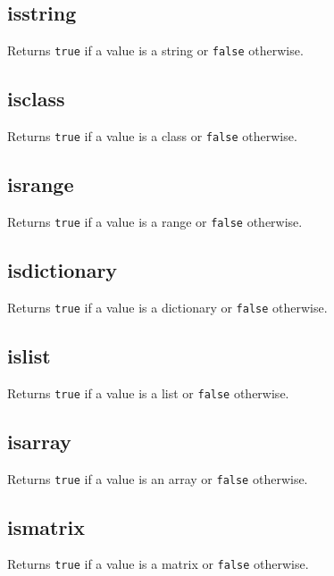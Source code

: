 \hypertarget{isstring}{%
\subsection{isstring}\label{isstring}}

Returns \texttt{true} if a value is a string or \texttt{false}
otherwise.

\hypertarget{isclass}{%
\subsection{isclass}\label{isclass}}

Returns \texttt{true} if a value is a class or \texttt{false} otherwise.

\hypertarget{isrange}{%
\subsection{isrange}\label{isrange}}

Returns \texttt{true} if a value is a range or \texttt{false} otherwise.

\hypertarget{isdictionary}{%
\subsection{isdictionary}\label{isdictionary}}

Returns \texttt{true} if a value is a dictionary or \texttt{false}
otherwise.

\hypertarget{islist}{%
\subsection{islist}\label{islist}}

Returns \texttt{true} if a value is a list or \texttt{false} otherwise.

\hypertarget{isarray}{%
\subsection{isarray}\label{isarray}}

Returns \texttt{true} if a value is an array or \texttt{false}
otherwise.

\hypertarget{ismatrix}{%
\subsection{ismatrix}\label{ismatrix}}

Returns \texttt{true} if a value is a matrix or \texttt{false}
otherwise.

